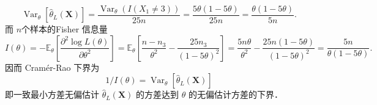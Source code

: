 \documentclass[UTF8,openany]{book}
\begin{document}
	$$
	\operatorname{Var}_\theta\left[\hat{\theta}_L(\boldsymbol{X})\right]=\frac{\operatorname{Var}_\theta\left(I\left(X_1 \neq 3\right)\right)}{25 n}=\frac{5 \theta(1-5 \theta)}{25 n}=\frac{\theta(1-5 \theta)}{5 n} .
	$$
	而 $n$个样本的Fisher 信息量
	$$
	I(\theta)=-\mathbb{E}_\theta\left[\frac{\partial^2 \log L(\theta)}{\partial \theta^2}\right]=\mathbb{E}_\theta\left[\frac{n-n_3}{\theta^2}-\frac{25 n_3}{(1-5 \theta)^2}\right]=\frac{5 n \theta}{\theta^2}-\frac{25 n(1-5 \theta)}{(1-5 \theta)^2}=\frac{5 n}{\theta(1-5 \theta)} .
	$$
	因而 Cramér-Rao 下界为 
	$$1 / I(\theta)=\operatorname{Var}_\theta\left[\hat{\theta}_L(\boldsymbol{X})\right]$$
	即一致最小方差无偏估计 $\hat{\theta}_L(\boldsymbol{X})$ 的方差达到 $\theta$ 的无偏估计方差的下界．\\
	
	
	
\end{document}
